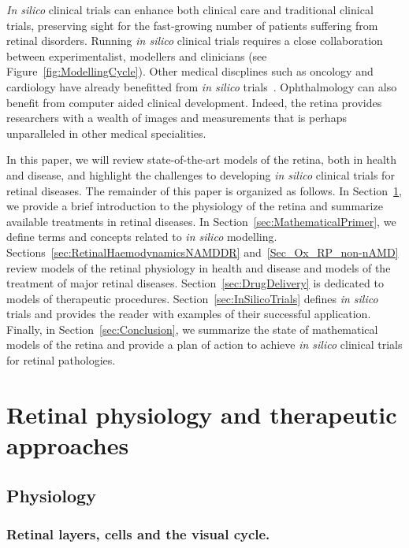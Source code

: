 \documentclass{article}
\begin{document}
\textit{In silico} clinical trials can enhance both clinical care and traditional clinical trials, preserving sight for the fast-growing number of patients suffering from retinal disorders.
Running \textit{in silico} clinical trials requires a close collaboration between experimentalist, modellers and clinicians (see Figure~\ref{fig:ModellingCycle}).
Other medical discplines such as oncology and cardiology have already benefitted from \textit{in silico} trials~\cite{Gaffney2022,Ravvaz2017}.
Ophthalmology can also benefit from computer aided clinical development.
Indeed, the retina provides researchers with a wealth of images and measurements that is perhaps unparalleled in other medical specialities.

In this paper, we will review state-of-the-art models of the retina, both in health and disease, and highlight the challenges to developing \textit{in silico} clinical trials for retinal diseases.
The remainder of this paper is organized as follows.
In Section~\ref{sec:RetinalPhysiology}, we provide a brief introduction to the physiology of the retina and summarize available treatments in retinal diseases.
In Section~\ref{sec:MathematicalPrimer}, we define terms and concepts related to \textit{in silico} modelling.
Sections~\ref{sec:RetinalHaemodynamicsNAMDDR} and~\ref{Sec_Ox_RP_non-nAMD} review models of the retinal physiology in health and disease and models of the treatment of major retinal diseases.
Section~\ref{sec:DrugDelivery} is dedicated to models of therapeutic procedures.
Section~\ref{sec:InSilicoTrials} defines \textit{in silico} trials and provides the reader with examples of their successful application.
Finally, in Section~\ref{sec:Conclusion}, we summarize the state of mathematical models of the retina and provide a plan of action to achieve \textit{in silico} clinical trials for retinal pathologies.

\section{Retinal physiology and therapeutic approaches}\label{sec:RetinalPhysiology}

\subsection{Physiology}


\subsubsection{Retinal layers, cells and the visual cycle.}
\end{document}
